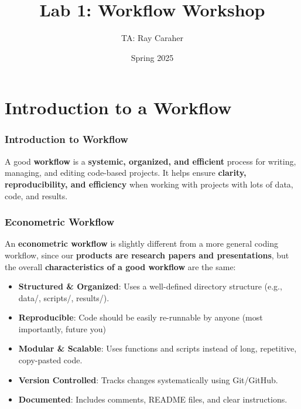 \documentclass{beamer}
\title[Lab 1]{Lab 1: Workflow Workshop}
\author[R. Caraher]{TA: Ray Caraher}
\institute[Econ 755]{UMass Amherst -- Econ 755}
\date{Spring 2025}
\begin{document}
\frame{\titlepage}




\section{Introduction to a Workflow}
\label{sec:intro}

\begin{frame}
\frametitle{Introduction to Workflow}

A good \textbf{workflow} is a \textbf{systemic, organized, and efficient} process for writing, managing, and editing code-based projects.
It helps ensure \textbf{clarity, reproducibility, and efficiency} when working with projects with lots of data, code, and results.


\end{frame}

\begin{frame}
    \frametitle{Econometric Workflow}

An \textbf{econometric workflow} is slightly different from a more general coding workflow, 
since our \textbf{products are research papers and presentations},
but the overall \textbf{characteristics of a good workflow} are the same:

\begin{itemize}[<+->]
    \item \textbf{Structured \& Organized}: Uses a well-defined directory structure (e.g., data/, scripts/, results/).
    \item \textbf{Reproducible}: Code should be easily re-runnable by anyone (most importantly, future you)
    \item \textbf{Modular \& Scalable}: Uses functions and scripts instead of long, repetitive, copy-pasted code.
    \item \textbf{Version Controlled}: Tracks changes systematically using Git/GitHub.
    \item \textbf{Documented}: Includes comments, README files, and clear instructions.
\end{itemize}

\end{frame}
\end{document}
